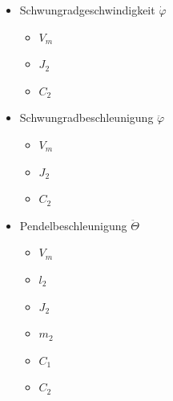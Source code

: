 \begin{minipage}[t]{.5\textwidth}
    \begin{itemize}
        \item Schwungradgeschwindigkeit $\dot\varphi$
        \begin{itemize}
            \item $V_m$
            \item $J_2$
            \item $C_2$
        \end{itemize}
        \item Schwungradbeschleunigung $\ddot\varphi$
        \begin{itemize}
            \item $V_m$
            \item $J_2$
            \item $C_2$
        \end{itemize}
        \item Pendelbeschleunigung $\ddot\Theta$
        \begin{itemize}
            \item $V_m$
            \item $l_2$
            \item $J_2$
            \item $m_2$
            \item $C_1$
            \item $C_2$
        \end{itemize}
        \end{itemize}
\end{minipage}
